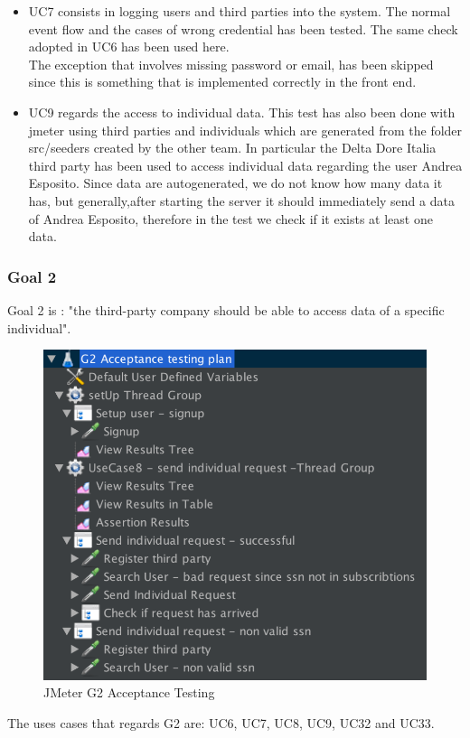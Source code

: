 \begin{itemize}
\item UC7 consists in logging users and third parties into the system. The normal event flow and the cases of wrong credential has been
tested.
The same check adopted in UC6 has been used here. \\ 
The exception that involves missing password or email, has been skipped since this is something that is implemented correctly in the front 
end.

\item UC9 regards the access to individual data. This test has also been done with jmeter using third parties and individuals which are generated from the folder src/seeders created by the other team. In particular the Delta Dore Italia third party has been used to access individual data regarding the user Andrea Esposito. Since data are autogenerated, we do not know how many data it has, but generally,after starting the server it should immediately send a data of Andrea Esposito, therefore in the test we check if it exists at least one data.

\end{itemize}


\subsubsection{Goal 2}
Goal 2 is : "the third-party company should be able to access data of a specific individual".

\begin{figure}[H]
\includegraphics[width=0.7\linewidth]{images/goal2}
\centering
\caption{ JMeter G2 Acceptance Testing }
\label{fig:goal2}
\end{figure}

The uses cases that regards G2 are: UC6, UC7, UC8, UC9, UC32 and UC33.  

